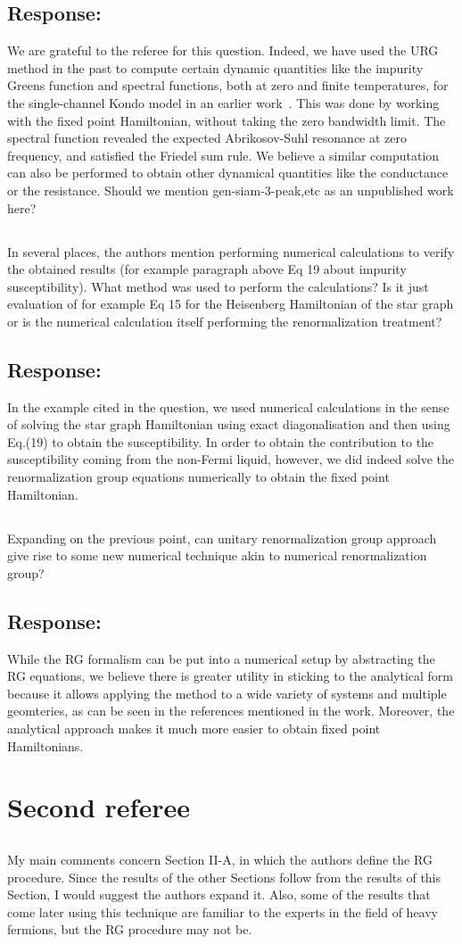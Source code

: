 \documentclass[11pt]{article}
\newcommand{\response}[1]{{\color{blue}\subsection*{Response:}{#1}}}
\newcommand{\point}[1]{\subsection{}{#1}}
\begin{document}
\response{ We are grateful to the referee for this question. Indeed, we have used the URG method in the past to compute certain dynamic quantities like the impurity Greens function and spectral functions, both at zero and finite temperatures, for the single-channel Kondo model in an earlier work~\cite{kondo_urg}. This was done by working with the fixed point Hamiltonian, without taking the zero bandwidth limit. The spectral function revealed the expected Abrikosov-Suhl resonance at zero frequency, and satisfied the Friedel sum rule. We believe a similar  computation can also be performed to obtain other dynamical quantities like the conductance or the resistance. {\color{red}Should we mention gen-siam-3-peak,etc as an unpublished work here?}}

\point{
In several places, the authors mention performing numerical calculations to verify the obtained results (for example paragraph above Eq 19 about impurity susceptibility). What method was used to perform the calculations? Is it just evaluation of for example Eq 15 for the Heisenberg Hamiltonian of the star graph or is the numerical calculation itself performing the renormalization treatment?}

\response{ In the example cited in the question, we used numerical calculations in the sense of solving the star graph Hamiltonian using exact diagonalisation and then using Eq.(19) to obtain the susceptibility. In order to obtain the contribution to the susceptibility coming from the non-Fermi liquid, however, we did indeed solve the renormalization group equations numerically to obtain the fixed point Hamiltonian.}

\point{
Expanding on the previous point, can unitary renormalization group approach give rise to some new numerical technique akin to numerical renormalization group?}

\response{While the RG formalism can be put into a numerical setup by abstracting the RG equations, we believe there is greater utility in sticking to the analytical form because it allows applying the method to a wide variety of systems and multiple geomteries, as can be seen in the references mentioned in the work. Moreover, the analytical approach makes it much more easier to obtain fixed point Hamiltonians.}

\section{Second referee}

\point{
My main comments concern Section II-A, in which the authors define the RG procedure. Since the results of the other Sections follow from the results of this Section, I would suggest the authors expand it. Also, some of the results that come later using this technique are familiar to the experts in the field of heavy fermions, but the RG procedure may not be.}
\end{document}
